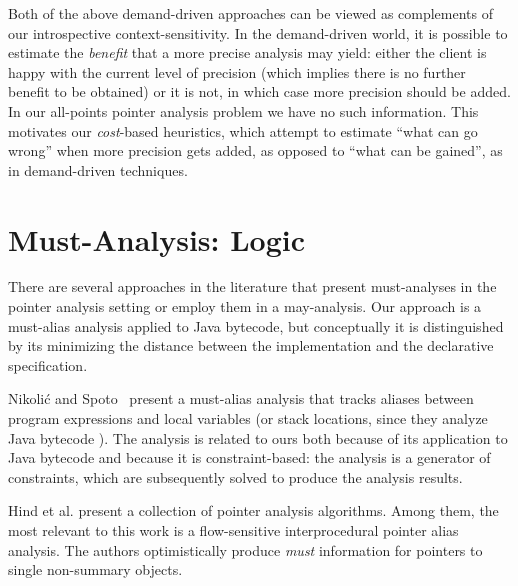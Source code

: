 Both of the above demand-driven approaches can be viewed as
complements of our introspective context-sensitivity. In the
demand-driven world, it is possible to estimate the \emph{benefit}
that a more precise analysis may yield: either the client is happy
with the current level of precision (which implies there is no further
benefit to be obtained) or it is not, in which case more precision
should be added. In our all-points pointer analysis problem we have no
such information. This motivates our \emph{cost}-based heuristics,
which attempt to estimate ``what can go wrong'' when more precision
gets added, as opposed to ``what can be gained'', as in demand-driven
techniques.


\section{Must-Analysis: Logic}

There are several approaches in the literature that present
must-analyses in the pointer analysis setting or employ them in a
may-analysis. Our approach is a must-alias analysis applied to Java
bytecode, but conceptually it is distinguished by its minimizing the
distance between the implementation and the declarative specification.


Nikoli\'{c} and Spoto~\cite{ictac:2012:Nikolic} present a
must-alias analysis that tracks aliases between program expressions
and local variables (or stack locations, since they analyze Java
bytecode%
).  The analysis
is related to ours both because of its application to Java bytecode
and because it is constraint-based: the analysis is a generator of
constraints, which are subsequently solved to produce the analysis
results.

Hind et al. \cite{article:1999:Hind} present a collection of pointer
analysis algorithms. Among them, the most relevant to this work is a
flow-sensitive interprocedural pointer alias analysis. The authors
optimistically produce \emph{must} information for pointers to single
non-summary objects.

